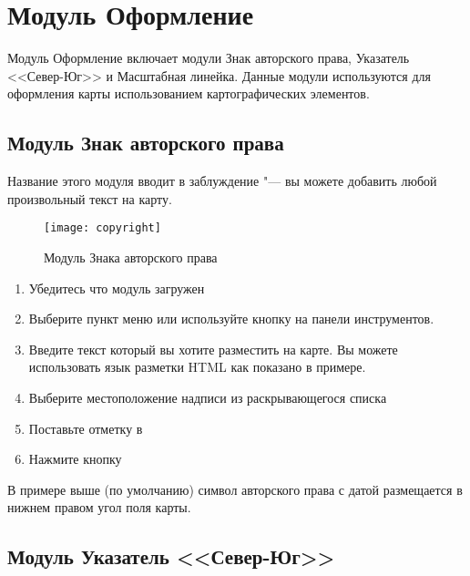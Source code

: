 
\section{Модуль Оформление}


Модуль Оформление включает модули Знак авторского права, Указатель
<<Север-Юг>> и Масштабная линейка. Данные модули используются для
оформления карты использованием картографических элементов.

\subsection{Модуль Знак авторского права}

Название этого модуля вводит в заблуждение "--- вы можете добавить любой
произвольный текст на карту.

\begin{figure}[ht]
   \centering
   \texttt{[image: copyright]}
   \caption{Модуль Знака авторского права \nixcaption}\label{fig:copyright}
\end{figure}

\begin{enumerate}
\item Убедитесь что модуль загружен
\item Выберите пункт меню  \arrow {}
\arrow {} или
используйте кнопку 
на панели инструментов.
\item Введите текст который вы хотите разместить на карте. Вы можете
использовать язык разметки HTML как показано в примере.
\item Выберите местоположение надписи из раскрывающегося списка
\item Поставьте отметку в 
\item Нажмите кнопку 
\end{enumerate}

В примере выше (по умолчанию) символ авторского права с датой размещается
в нижнем правом угол поля карты.

\subsection{Модуль Указатель <<Север-Юг>>}

